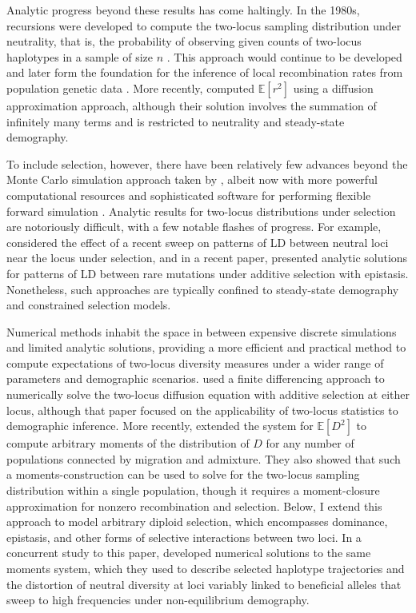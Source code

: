 \documentclass[]{article}
\newcommand{\E}{\mathbb{E}}
\begin{document}
Analytic progress beyond these results has come haltingly. In the 1980s,
recursions were developed to compute the two-locus sampling distribution under
neutrality, that is, the probability of observing given counts of two-locus
haplotypes in a sample of size \(n\) \citep{Golding1984-pu}. This approach
would continue to be developed and later form the foundation for the inference
of local recombination rates from population genetic data
\citep{Hudson2001-sg,McVean2004-gj}. More recently, \citet{Song2007-qk}
computed \(\E[r^2]\) using a diffusion approximation approach, although their
solution involves the summation of infinitely many terms and is restricted to
neutrality and steady-state demography.

To include selection, however, there have been relatively few advances beyond
the Monte Carlo simulation approach taken by \citet{Hill1966-gv}, albeit now
with more powerful computational resources and sophisticated software for
performing flexible forward simulation
\citep[e.g.][0]{Thornton2019-qc,Haller2019-vm}. Analytic results for two-locus
distributions under selection are notoriously difficult, with a few notable
flashes of progress. For example, \citet{McVean2007-xd} considered the effect
of a recent sweep on patterns of LD between neutral loci near the locus under
selection, and in a recent paper, \citet{Good2022-ot} presented analytic
solutions for patterns of LD between rare mutations under additive selection
with epistasis. Nonetheless, such approaches are typically confined to
steady-state demography and constrained selection models.

Numerical methods inhabit the space in between expensive discrete simulations
and limited analytic solutions, providing a more efficient and practical method
to compute expectations of two-locus diversity measures under a wider range of
parameters and demographic scenarios. \citet{Ragsdale2017-gg} used a finite
differencing approach to numerically solve the two-locus diffusion equation
with additive selection at either locus, although that paper focused on the
applicability of two-locus statistics to demographic inference. More recently,
\citet{Ragsdale2019-nt} extended the \citet{Hill1968-vu} system for \(\E[D^2]\)
to compute arbitrary moments of the distribution of \(D\) for any number of
populations connected by migration and admixture. They also showed that such a
moments-construction can be used to solve for the two-locus sampling
distribution within a single population, though it requires a moment-closure
approximation for nonzero recombination and selection. Below, I extend this
approach to model arbitrary diploid selection, which encompasses dominance,
epistasis, and other forms of selective interactions between two loci. In a
concurrent study to this paper, \citet{Friedlander2022-bs} developed numerical
solutions to the same moments system, which they used to describe selected
haplotype trajectories and the distortion of neutral diversity at loci variably
linked to beneficial alleles that sweep to high frequencies under
non-equilibrium demography.
\end{document}

